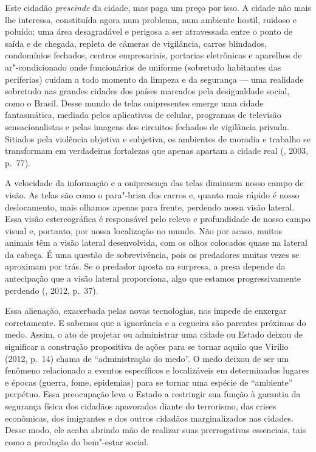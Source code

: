 Este cidadão \emph{prescinde} da cidade, mas paga um preço por isso. A cidade não mais lhe interessa, constituída agora num problema, num ambiente hostil, ruidoso e poluído; uma área desagradável e perigosa a ser atravessada entre o ponto de saída e de chegada, repleta de câmeras de vigilância, carros
blindados, condomínios fechados, centros empresariais, portarias
eletrônicas e aparelhos de ar"-condicionado onde funcionários de uniforme
(sobretudo habitantes das periferias) cuidam a todo momento da limpeza e
da segurança --- uma realidade sobretudo nas grandes cidades dos países
marcados pela desigualdade social, como o Brasil. Desse mundo de telas
onipresentes emerge uma cidade fantasmática, mediada pelos aplicativos
de celular, programas de televisão sensacionalistas e pelas imagens dos
circuitos fechados de vigilância privada. Sitiados pela violência
objetiva e subjetiva, os ambientes de moradia e trabalho se transformam
em verdadeiras fortalezas que apenas apartam a cidade real (,
2003, p.~77).

A velocidade da informação e a onipresença das telas diminuem nosso
campo de visão. As telas são como o para"-brisa dos carros e, quanto mais
rápido é nosso deslocamento, mais olhamos apenas para frente, perdendo
nossa visão lateral. Essa visão estereográfica é responsável pelo relevo
e profundidade de nosso campo visual e, portanto, por nossa localização
no mundo. Não por acaso, muitos animais têm a visão lateral
desenvolvida, com os olhos colocados quase na lateral da cabeça. É uma
questão de sobrevivência, pois os predadores muitas vezes se aproximam
por trás. Se o predador aposta na surpresa, a presa depende da
antecipação que a visão lateral proporciona, algo que estamos
progressivamente perdendo (, 2012, p.~37).

Essa alienação, exacerbada pelas novas tecnologias, nos impede de
enxergar corretamente. E sabemos que a ignorância e a cegueira são
parentes próximas do medo. Assim, o ato de projetar ou administrar uma
cidade ou Estado deixou de significar a construção propositiva de ações
para se tornar aquilo que Virilio (2012, p.~14) chama de ``administração
do medo''. O medo deixou de ser um fenômeno relacionado a eventos
específicos e localizáveis em determinados lugares e épocas (guerra,
fome, epidemias) para se tornar uma espécie de ``ambiente'' perpétuo.
Essa preocupação leva o Estado a restringir sua função à garantia da
segurança física dos cidadãos apavorados diante do terrorismo, das
crises econômicas, dos imigrantes e dos outros cidadãos marginalizados
nas cidades. Desse modo, ele acaba abrindo mão de realizar suas
prerrogativas essenciais, tais como a produção do bem"-estar social.

